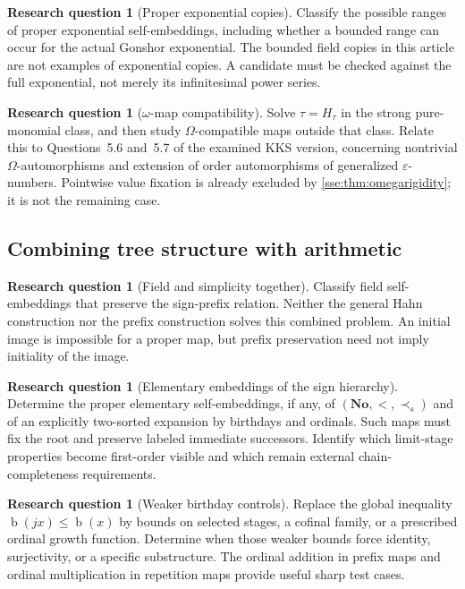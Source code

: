 \documentclass[11pt,a4paper]{article}
\numberwithin{equation}{section}
\theoremstyle{plain}
\theoremstyle{definition}
\newtheorem{question}[theorem]{Research question}
\theoremstyle{remark}
\newcommand{\No}{\mathbf{No}}
\newcommand{\bday}{\operatorname{b}}
\newcommand{\spref}{\prec_s}
\begin{document}
\begin{question}[Proper exponential copies]
Classify the possible ranges of proper exponential self-embeddings,
including whether a bounded range can occur for the actual Gonshor
exponential. The bounded field copies in this article are not examples
of exponential copies. A candidate must be checked against the full
exponential, not merely its infinitesimal power series.
\end{question}

\begin{question}[$\omega$-map compatibility]
Solve $\tau=H_\tau$ in the strong pure-monomial class, and then study
$\Omega$-compatible maps outside that class. Relate this to Questions~5.6
and~5.7 of the examined KKS version, concerning nontrivial
$\Omega$-automorphisms and extension of order automorphisms of generalized
$\varepsilon$-numbers. Pointwise value fixation is already excluded by
\cref{sse:thm:omegarigidity}; it is not the remaining case.
\end{question}

\subsection{Combining tree structure with arithmetic}
\begin{question}[Field and simplicity together]
Classify field self-embeddings that preserve the sign-prefix relation.
Neither the general Hahn construction nor the prefix construction solves
this combined problem. An initial image is impossible for a proper map,
but prefix preservation need not imply initiality of the image.
\end{question}

\begin{question}[Elementary embeddings of the sign hierarchy]
Determine the proper elementary self-embeddings, if any, of
$(\No,<,\spref)$ and of an explicitly two-sorted expansion by birthdays
and ordinals. Such maps must fix the root and preserve labeled immediate
successors. Identify which limit-stage properties become first-order
visible and which remain external chain-completeness requirements.
\end{question}

\begin{question}[Weaker birthday controls]
Replace the global inequality $\bday(jx)\le\bday(x)$ by bounds on selected
stages, a cofinal family, or a prescribed ordinal growth function. Determine
when those weaker bounds force identity, surjectivity, or a specific
substructure. The ordinal addition in prefix maps and ordinal multiplication
in repetition maps provide useful sharp test cases.
\end{question}
\end{document}
